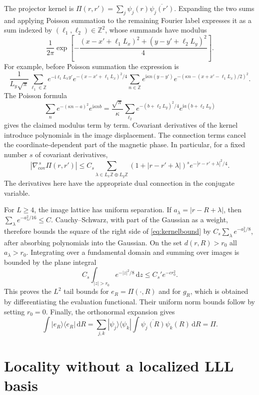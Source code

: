 \documentclass[11pt]{article}
\theoremstyle{definition}
\theoremstyle{remark}
\newcommand{\ii}{\mathrm i}
\newcommand{\dd}{\,\mathrm d}
\newcommand{\abs}[1]{\left|#1\right|}
\begin{document}
The projector kernel is
\(\Pi(r,r')=\sum_j\psi_j(r)\overline{\psi_j(r')}\).
Expanding the two sums and applying Poisson summation to the
remaining Fourier label expresses it as a sum indexed by
\((\ell_1,\ell_2)\in\mathbb Z^2\), whose summands have modulus
\[
 \frac1{2\pi}
 \exp\!\left[-\frac{(x-x'+\ell_1L_x)^2+(y-y'+\ell_2L_y)^2}{4}\right].
\]
For example, before Poisson summation the expression is
\[
 \frac1{L_y\sqrt\pi}\sum_{\ell_1\in\mathbb Z}
 e^{-\ii\ell_1L_xy'}e^{-(x-x'+\ell_1L_x)^2/4}
 \sum_{n\in\mathbb Z}e^{\ii\kappa n(y-y')}
 e^{-(\kappa n-(x+x'-\ell_1L_x)/2)^2}.
\]
The Poisson formula
\[
 \sum_n e^{-(\kappa n-a)^2}e^{\ii\kappa nb}
 =\frac{\sqrt\pi}{\kappa}\sum_{\ell_2}
       e^{-(b+\ell_2L_y)^2/4}e^{\ii a(b+\ell_2L_y)}
\]
gives the claimed modulus term by term.
Covariant derivatives of the kernel introduce polynomials in
the image displacement.  The connection terms cancel the
coordinate-dependent part of the magnetic phase.  In particular,
for a fixed number \(s\) of covariant derivatives,
\begin{equation}\label{eq:kernelbound}
 \abs{\nabla_{\mathrm{cov}}^{\,s}\Pi(r,r')}
 \le C_s\sum_{\lambda\in L_x\mathbb Z\oplus L_y\mathbb Z}
 (1+\abs{r-r'+\lambda})^s
                  e^{-\abs{r-r'+\lambda}^2/4}.
\end{equation}
The derivatives here have the appropriate dual connection
in the conjugate variable.

For \(L\ge4\), the image lattice has uniform separation.
If \(a_\lambda=\abs{r-R+\lambda}\), then
\(\sum_\lambda e^{-a_\lambda^2/16}\le C\).
Cauchy--Schwarz, with part of the Gaussian as a weight, therefore
bounds the square of the right side of \eqref{eq:kernelbound}
by \(C_s\sum_\lambda e^{-a_\lambda^2/8}\), after absorbing
polynomials into the Gaussian.
On the set \(d(r,R)>r_0\) all \(a_\lambda>r_0\).
Integrating over a fundamental domain and summing over images
is bounded by the plane integral
\[
 C_s\int_{\abs z>r_0}e^{-\abs z^2/8}\dd z
 \le C_s'e^{-c r_0^2}.
\]
This proves the \(L^2\) tail bounds for \(e_R=\Pi(\cdot,R)\)
and for \(g_R\), which is obtained by differentiating the
evaluation functional.  Their uniform norm bounds follow
by setting \(r_0=0\).  Finally, the orthonormal expansion gives
\[
 \int |e_R\rangle\langle e_R|\dd R
 =\sum_{j,k}|\psi_j\rangle\langle\psi_k|
       \int\overline{\psi_j(R)}\psi_k(R)\dd R=\Pi.
\]

\section{Locality without a localized LLL basis}\label{app:locality}
\end{document}
